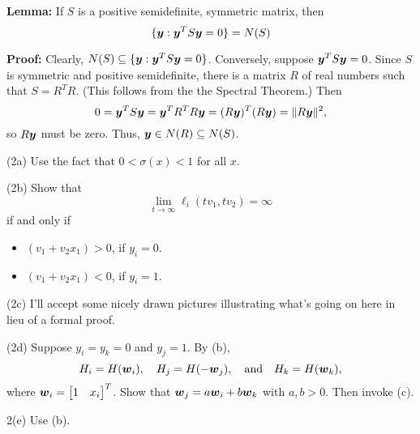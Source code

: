\documentclass[12pt]{amsart}
\begin{document}
        \textbf{Lemma:} If $S$ is a positive semidefinite, symmetric matrix, then
        \[
            \{\boldsymbol{y} : \boldsymbol{y}^TS\boldsymbol{y}=0\}=N(S)
        \]

        \textbf{Proof:} Clearly, $N(S)\subseteq\{\boldsymbol{y} : \boldsymbol{y}^TS\boldsymbol{y}=0\}$.
        Conversely, suppose $\boldsymbol{y}^TS\boldsymbol{y}=0$.
        Since $S$ is symmetric and positive semidefinite, there is a 
        matrix $R$ of real numbers such that $S = R^TR$.
        (This follows from the the Spectral Theorem.) Then
        \[
            0=\boldsymbol{y}^TS\boldsymbol{y} = \boldsymbol{y}^TR^TR\boldsymbol{y} = (R\boldsymbol{y})^T(R\boldsymbol{y}) = \|R\boldsymbol{y}\|^2,
        \]
        so $R\boldsymbol{y}$ must be zero. Thus, $\boldsymbol{y}\in N(R)\subseteq N(S)$.

        (2a) Use the fact that $0<\sigma(x)<1$ for all $x$.

        (2b) Show that
        \[
            \lim_{t\to\infty}\ell_i(tv_1, tv_2)=\infty
        \]
        if and only if
        \begin{itemize}
            \item $(v_1+v_2x_1)>0$, if $y_i=0$.
            \item $(v_1+v_2x_1)<0$, if $y_i=1$.
        \end{itemize}

        (2c) I'll accept some nicely drawn pictures illustrating what's going on here in lieu of a formal proof. 

        (2d) Suppose $y_i=y_k=0$ and $y_j=1$. By (b),
        \[
            H_i=H(\boldsymbol{w}_i),\quad H_j=H(-\boldsymbol{w}_j),\quad\text{and}\quad
            H_k=H(\boldsymbol{w}_k),
        \]
        where $\boldsymbol{w}_i=\begin{bmatrix}
            1&x_i
        \end{bmatrix}^T$.
        Show that $\boldsymbol{w}_j = a\boldsymbol{w}_i + b\boldsymbol{w}_k$ with $a, b>0$. Then invoke (c).

        2(e) Use (b).
    
\end{document}
